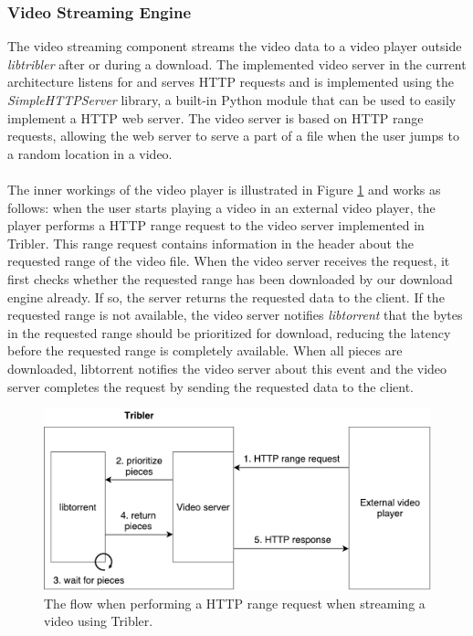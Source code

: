 \subsubsection{\textbf{Video Streaming Engine}}
\label{subsubsec:video-server}
The video streaming component streams the video data to a video player outside \emph{libtribler} after or during a download. The implemented video server in the current architecture listens for and serves HTTP requests and is implemented using the \emph{SimpleHTTPServer} library, a built-in Python module that can be used to easily implement a HTTP web server. The video server is based on HTTP range requests, allowing the web server to serve a part of a file when the user jumps to a random location in a video.\\\\
The inner workings of the video player is illustrated in Figure \ref{fig:video-server} and works as follows: when the user starts playing a video in an external video player, the player performs a HTTP range request to the video server implemented in Tribler. This range request contains information in the header about the requested range of the video file. When the video server receives the request, it first checks whether the requested range has been downloaded by our download engine already. If so, the server returns the requested data to the client. If the requested range is not available, the video server notifies \emph{libtorrent} that the bytes in the requested range should be prioritized for download, reducing the latency before the requested range is completely available. When all pieces are downloaded, libtorrent notifies the video server about this event and the video server completes the request by sending the requested data to the client.\\

\begin{figure}[h!]
	\centering
	\includegraphics[width=0.7\columnwidth]{images/architecture/video_server}
	\caption{The flow when performing a HTTP range request when streaming a video using Tribler.}
	\label{fig:video-server}
\end{figure}

